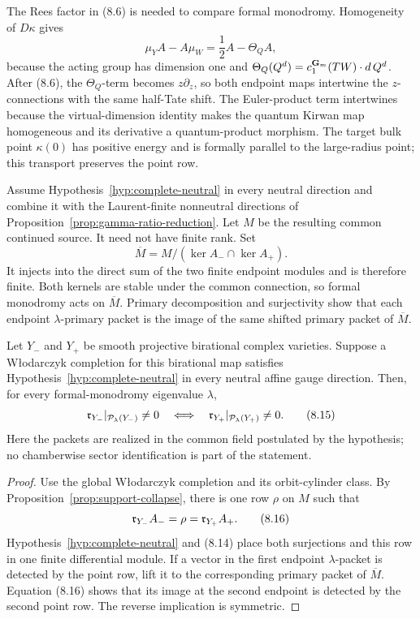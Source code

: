 The Rees factor in (8.6) is needed to compare formal monodromy.  Homogeneity
of \(D\kappa\) gives
\[
 \mu_YA-A\mu_W=\frac12A-\Theta_QA,                            \tag{8.13}
\]
because the acting group has dimension one and
\(\Theta_Q(Q^d)=c_1^{\mathbf G_m}(TW)\cdot d\,Q^d\).  After (8.6), the
\(\Theta_Q\)-term becomes \(z\partial_z\), so both endpoint maps intertwine
the \(z\)-connections with the same half-Tate shift.  The Euler-product term
intertwines because the virtual-dimension identity makes the quantum Kirwan
map homogeneous and its derivative a quantum-product morphism.  The target
bulk point \(\kappa(0)\) has positive energy and is formally parallel to the
large-radius point; this transport preserves the point row.

Assume Hypothesis~\ref{hyp:complete-neutral} in every neutral direction and
combine it with the Laurent-finite nonneutral directions of
Proposition~\ref{prop:gamma-ratio-reduction}.  Let \(M\) be the resulting
common continued source.  It need not have finite rank.  Set
\[
 \overline M=M/(\ker A_-\cap\ker A_+).                        \tag{8.14}
\]
It injects into the direct sum of the two finite endpoint modules and is
therefore finite.  Both kernels are stable under the common connection, so
formal monodromy acts on \(\overline M\).  Primary decomposition and
surjectivity show that each endpoint \(\lambda\)-primary packet is the image
of the same shifted primary packet of \(\overline M\).

\begin{theorem}
\label{thm:birational-point-primary}
Let \(Y_-\) and \(Y_+\) be smooth projective birational complex varieties.
Suppose a W{\l}odarczyk completion for this birational map satisfies
Hypothesis~\ref{hyp:complete-neutral} in every neutral affine gauge
direction.  Then, for every formal-monodromy eigenvalue \(\lambda\),
\[
 \mathfrak r_{Y_-}|_{\mathcal P_\lambda(Y_-)}\ne0
 \quad\Longleftrightarrow\quad
 \mathfrak r_{Y_+}|_{\mathcal P_\lambda(Y_+)}\ne0.                       \tag{8.15}
\]
Here the packets are realized in the common field postulated by the
hypothesis; no chamberwise sector identification is part of the statement.
\end{theorem}

\begin{proof}
Use the global W{\l}odarczyk completion and its orbit-cylinder class.  By
Proposition~\ref{prop:support-collapse}, there is one row \(\rho\) on \(M\)
such that
\[
 \mathfrak r_{Y_-}A_-=\rho=\mathfrak r_{Y_+}A_+.                         \tag{8.16}
\]
Hypothesis~\ref{hyp:complete-neutral} and (8.14) place both surjections and this
row in one finite differential module.  If a vector in the first endpoint
\(\lambda\)-packet is detected by the point row, lift it to the corresponding
primary packet of \(\overline M\).  Equation (8.16) shows that its image at
the second endpoint is detected by the second point row.  The reverse
implication is symmetric.
\end{proof}

